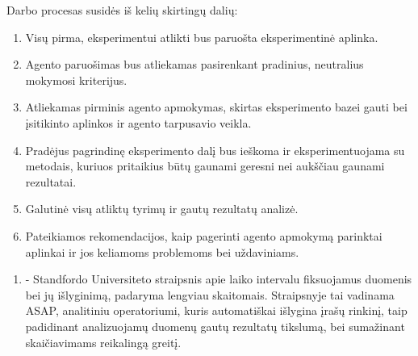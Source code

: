 \documentclass{VUMIFPSbakalaurinis}
\begin{document}
Darbo procesas susidės iš kelių skirtingų dalių:

\begin{enumerate}
	\item Visų pirma, eksperimentui atlikti bus paruošta eksperimentinė aplinka.
	\item Agento paruošimas bus atliekamas pasirenkant pradinius, neutralius mokymosi kriterijus.
	\item Atliekamas pirminis agento apmokymas, skirtas eksperimento bazei gauti bei įsitikinto aplinkos ir agento tarpusavio veikla. 
	\item Pradėjus pagrindinę eksperimento dalį bus ieškoma ir eksperimentuojama su metodais, kuriuos pritaikius būtų gaunami geresni nei aukščiau gaunami rezultatai.
	\item Galutinė visų atliktų tyrimų ir gautų rezultatų analizė.
	\item Pateikiamos rekomendacijos, kaip pagerinti agento apmokymą parinktai aplinkai ir jos keliamoms problemoms bei uždaviniams.
\end{enumerate}



\begin{enumerate}
	\item \textbf{\cite{asap}} - Standfordo Universiteto straipsnis apie laiko intervalu fiksuojamus duomenis bei jų išlyginimą, padaryma lengviau skaitomais. Straipsnyje tai vadinama ASAP, analitiniu operatoriumi, kuris automatiškai išlygina įrašų rinkinį, taip padidinant analizuojamų duomenų gautų rezultatų tikslumą, bei sumažinant skaičiavimams reikalingą greitį.
\end{enumerate}





\end{document}
